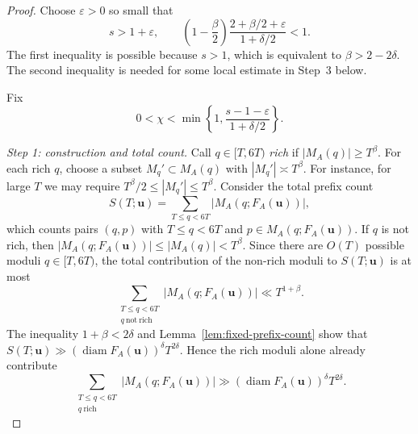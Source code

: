 \documentclass[11pt]{amsart}
\newcommand{\eps}{\varepsilon}
\newcommand{\diam}{\operatorname{diam}}
\begin{document}
\begin{proof}
Choose $\eps>0$ so small that
\begin{equation}\label{eq:eps-choice-pair}
 s>1+\eps,
 \qquad
 \left(1-\frac\beta2\right)
 \frac{2+\beta/2+\eps}{1+\delta/2}<1.
\end{equation}
The first inequality is possible because $s>1$, which is equivalent to
$\beta>2-2\delta$. The second inequality is needed for some local estimate in Step~3 below. 

Fix
\begin{equation}\label{eq:chi-choice}
 0<\chi<\min\left\{1,
 \frac{s-1-\eps}{1+\delta/2}\right\}.
\end{equation}

\medskip
\noindent\emph{Step 1: construction and total count.}
Call $q\in[T,6T)$ \emph{rich} if $|M_A(q)|\ge T^\beta$.  For each
rich $q$, choose a subset $M_q'\subset M_A(q)$ with
$|M_q'|\asymp T^\beta$. For instance, for large $T$ we may require
$T^\beta/2\le |M_q'|\le T^\beta$.  Consider the total prefix count
$$
 S(T;\mathbf{u})=\sum_{T\le q<6T}|M_A(q;F_A(\mathbf{u}))|,
$$
which counts pairs $(q,p)$ with $T\le q<6T$ and $p\in M_A(q;F_A(\mathbf{u}))$.
If $q$ is not rich, then
$|M_A(q;F_A(\mathbf{u}))|\le |M_A(q)|<T^\beta$.  Since there are $O(T)$ possible
moduli $q\in[T,6T)$, the total contribution of the non-rich moduli to
$S(T;\mathbf{u})$ is at most
$$
 \sum_{\substack{T\le q<6T\\ q\ \mathrm{not\ rich}}}
 |M_A(q;F_A(\mathbf{u}))|\ll T^{1+\beta}.
$$
The inequality $1+\beta<2\delta$ and Lemma~\ref{lem:fixed-prefix-count} show that
$S(T;\mathbf{u})\gg (\diam F_A(\mathbf{u}))^\delta T^{2\delta}$.  Hence the rich moduli alone
already contribute
\begin{equation}\label{eq:high-prefix-mass}
 \sum_{\substack{T\le q<6T\\q\ \mathrm{rich}}}
 |M_A(q;F_A(\mathbf{u}))|
 \gg (\diam F_A(\mathbf{u}))^\delta T^{2\delta}.
\end{equation}


\end{proof}
\end{document}
